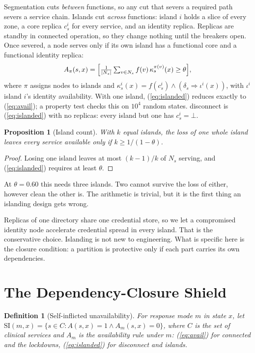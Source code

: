 \documentclass[conference,compsoc]{IEEEtran}
\newtheorem{definition}{Definition}
\newtheorem{proposition}{Proposition}
\begin{document}
Segmentation cuts \emph{between} functions, so any cut that severs a
required path severs a service chain. Islands cut \emph{across} functions:
island $i$ holds a slice of every zone, a core replica $c_s^i$ for every
service, and an identity replica. Replicas are standby in connected
operation, so they change nothing until the breakers open. Once severed, a
node serves only if its own island has a functional core and a functional
identity replica:
\begin{equation}
A_{\pi}(s,x)=\Bigl[\tfrac{1}{|N_s|}\textstyle\sum_{v\in N_s}
f(v)\,\kappa^{\pi(v)}_s(x)\ge\theta\Bigr],
\label{eq:islanded}
\end{equation}
where $\pi$ assigns nodes to islands and $\kappa^i_s(x)=f(c^i_s)\wedge
(\delta_s\Rightarrow\iota^i(x))$, with $\iota^i$ island $i$'s identity
availability. With one island, (\ref{eq:islanded}) reduces exactly to
(\ref{eq:avail}); a property test checks this on $10^4$ random states.
\textsf{disconnect} is (\ref{eq:islanded}) with no replicas: every island
but one has $c^i_s=\bot$.

\begin{proposition}[Island count]
With $k$ equal islands, the loss of one whole island leaves every service
available only if $k\ge 1/(1-\theta)$.
\end{proposition}
\begin{proof}
Losing one island leaves at most $(k-1)/k$ of $N_s$ serving, and
(\ref{eq:islanded}) requires at least $\theta$.
\end{proof}
At $\theta=0.60$ this needs three islands. Two cannot survive the loss of
either, however clean the other is. The arithmetic is trivial, but it is the
first thing an islanding design gets wrong.

Replicas of one directory share one credential store, so we let a
compromised identity node accelerate credential spread in every island.
That is the conservative choice. Islanding is not new to engineering. What
is specific here is the closure condition: a partition is protective only
if each part carries its own dependencies.

\section{The Dependency-Closure Shield}
\label{sec:shield}

\begin{definition}[Self-inflicted unavailability]
For response mode $m$ in state $x$, let
$\mathrm{SI}(m,x)=\{s\in C: A(s,x)=1\wedge A_m(s,x)=0\}$, where $C$ is the set of
clinical services and $A_m$ is the availability rule under $m$:
(\ref{eq:avail}) for \textsf{connected} and the lockdowns, (\ref{eq:islanded})
for \textsf{disconnect} and \textsf{islands}.
\end{definition}
\end{document}
